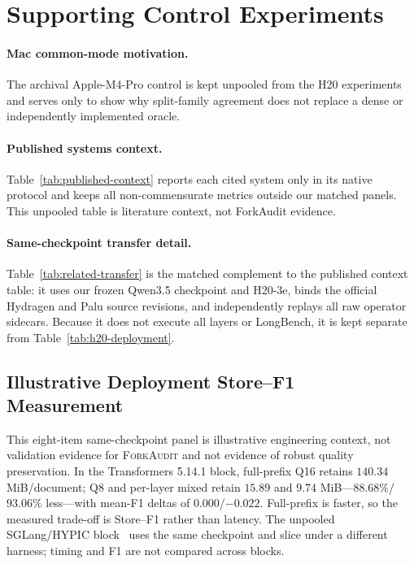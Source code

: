 \documentclass{article}
\newcommand{\method}{\textsc{ForkAudit}}
\begin{document}
\FloatBarrier

\section{Supporting Control Experiments}
\label{app:controls}

\paragraph{Mac common-mode motivation.}
The archival Apple-M4-Pro control is kept unpooled from the H20 experiments and
serves only to show why split-family agreement does not replace a dense or
independently implemented oracle.


\paragraph{Published systems context.}
Table~\ref{tab:published-context} reports each cited system only in its native
protocol and keeps all non-commensurate metrics outside our matched panels.
This unpooled table is literature context, not ForkAudit evidence.


\paragraph{Same-checkpoint transfer detail.}
Table~\ref{tab:related-transfer} is the matched complement to the published
context table: it uses our frozen Qwen3.5 checkpoint and H20-3e, binds the
official Hydragen and Palu source revisions, and independently replays all raw
operator sidecars.  Because it does not execute all layers or LongBench, it is
kept separate from Table~\ref{tab:h20-deployment}.


\subsection{Illustrative Deployment Store--F1 Measurement}
\label{app:illustrative-store}

This eight-item same-checkpoint panel is illustrative engineering context, not
validation evidence for \method{} and not evidence of robust quality
preservation.  In the Transformers 5.14.1 block, full-prefix Q16 retains
$140.34$ MiB/document; Q8 and per-layer mixed retain $15.89$ and $9.74$
MiB---$88.68\%$/$93.06\%$ less---with mean-F1 deltas of $0.000$/$-0.022$.
Full-prefix is faster, so the measured trade-off is Store--F1 rather than
latency.  The unpooled SGLang/HYPIC block~\citep{liu2026hypic} uses the same
checkpoint and slice under a different harness; timing and F1 are not compared
across blocks.
\end{document}
